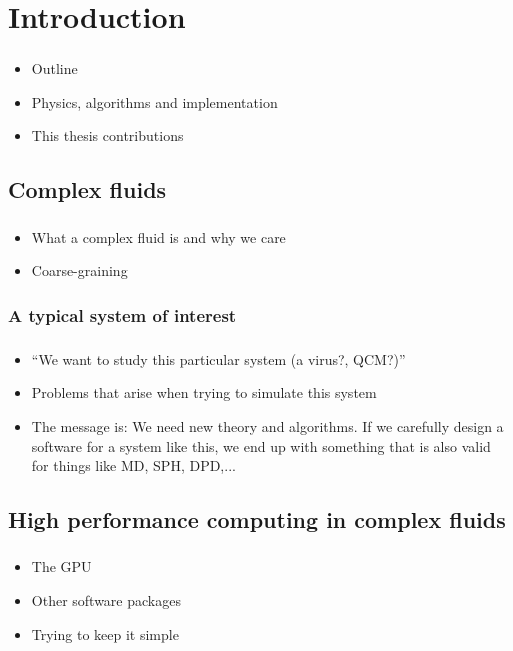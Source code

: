 \documentclass{beamer}
\begin{document}
\section{Introduction}
\begin{frame}
  \frametitle{\insertsection}
  \begin{itemize}
  \item Outline
  \item Physics, algorithms and implementation
  \item This thesis contributions
  \end{itemize}
\end{frame}

\subsection{Complex fluids}
\begin{frame}
  \frametitle{\insertsubsectionnavigation{\linewidth}}
  \begin{itemize}
  \item What a complex fluid is and why we care
  \item Coarse-graining
  \end{itemize}
\end{frame}
\subsubsection{A typical system of interest}
\begin{frame}
  \frametitle{\insertsubsectionnavigation{\linewidth}} 
  \framesubtitle{\insertsubsubsection}
  \begin{itemize}
  \item ``We want to study this particular system (a virus?, QCM?)''
  \item Problems that arise when trying to simulate this system
  \item The message is: We need new theory and algorithms. If we carefully design a software for a system like this, we end up with something that is also valid for things like MD,  SPH, DPD,...
  \end{itemize}
\end{frame}
\subsection{High performance computing in complex fluids}
\begin{frame}
  \frametitle{\insertsubsectionnavigation{\linewidth}} 
  \begin{itemize}
  \item The GPU
  \item Other software packages
  \item Trying to keep it simple
  \end{itemize}
\end{frame}
\end{document}
